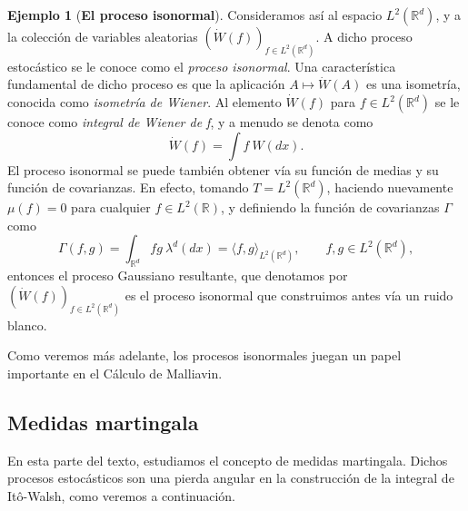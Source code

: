 \documentclass[letterpaper,twoside,12pt]{book}
\newcommand{\R}{\mathbb{R}}
\newcommand{\W}{\dot{W}}
\newcommand{\1}{\mathds{1}}
\theoremstyle{definition}
\theoremstyle{definition}
\theoremstyle{remark}
\theoremstyle{definition}
\theoremstyle{definition}
\theoremstyle{definition}
\theoremstyle{definition}
\newtheorem{ejem}{Ejemplo}
\theoremstyle{definition}
\begin{document}
\begin{ejem}[\textbf{El proceso isonormal}]
Consideramos así al espacio $L^{2}(\R^{d})$, y a la colección de variables aleatorias $(\W(f))_{f\in L^{2}(\R^{d})}$. A dicho proceso estocástico se le conoce como el \textit{proceso isonormal}. Una característica fundamental de dicho proceso es que la aplicación $A\mapsto\W(A)$ es una isometría, conocida como \textit{isometría de Wiener}. Al elemento $\W(f)$ para $f\in L^2(\R^{d})$ se le conoce como \textit{integral de Wiener de f}, y a menudo se denota como
\[
\W(f)=\int f \ W(dx).    
\] 
El proceso isonormal se puede también obtener vía su función de medias y su función de covarianzas. En efecto, tomando $T=L^{2}(\R^{d})$, haciendo nuevamente $\mu(f)=0$ para cualquier $f\in L^2(\R)$, y definiendo la función de covarianzas $\Gamma$ como
\[
\Gamma(f,g)=\int_{\R^d}fg \ \lambda^d(dx)=\langle f,g\rangle_{L^{2}(\R^{d})}, \qquad f,g\in L^2(\R^{d}),
\]
entonces el proceso Gaussiano resultante, que denotamos por $(\W(f))_{f\in L^{2}(\R^{d})}$ es el proceso isonormal que construimos antes vía un ruido blanco. 
 \end{ejem}

 Como veremos más adelante, los procesos isonormales juegan un papel importante en el Cálculo de Malliavin.
\subsection{Medidas martingala}

En esta parte del texto, estudiamos el concepto de medidas martingala. Dichos procesos estocásticos son una pierda angular en la construcción de la integral de Itô-Walsh, como veremos a continuación.
\end{document}
